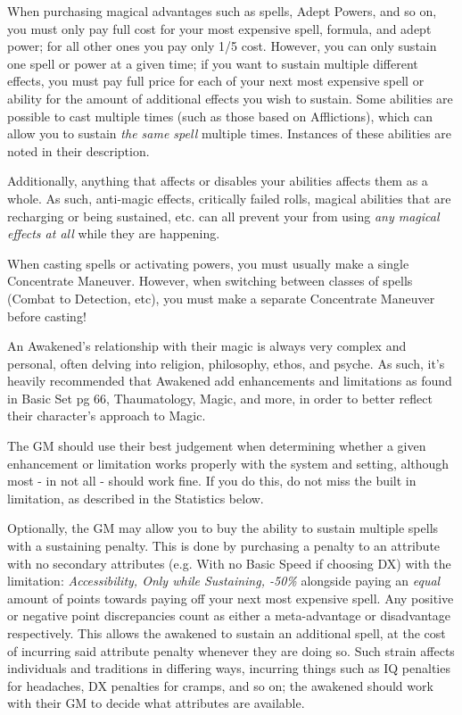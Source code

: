 \begin{multicols*}{3}
	When purchasing magical advantages such as spells, Adept Powers, and so on, you must only pay full cost for your most expensive spell, formula, and adept power; for all other ones you pay only 1/5 cost. However, you can only sustain one spell or power at a given time; if you want to sustain multiple different effects, you must pay full price for each of your next most expensive spell or ability for the amount of additional effects you wish to sustain. Some abilities are possible to cast multiple times (such as those based on Afflictions), which can allow you to sustain \textit{the same spell} multiple times. Instances of these abilities are noted in their description.
	
	Additionally, anything that affects or disables your abilities affects them as a whole. As such, anti-magic effects, critically failed rolls, magical abilities that are recharging or being sustained, etc. can all prevent your from using \textit{any magical effects at all} while they are happening.
	
	When casting spells or activating powers, you must usually make a single Concentrate Maneuver. However, when switching between classes of spells (Combat to Detection, etc), you must make a separate Concentrate Maneuver before casting!
	
	An Awakened's relationship with their magic is always very complex and personal, often delving into religion, philosophy, ethos, and psyche. As such, it's heavily recommended that Awakened add enhancements and limitations as found in Basic Set pg 66, Thaumatology, Magic, and more, in order to better reflect their character's approach to Magic.
	
	The GM should use their best judgement when determining whether a given enhancement or limitation works properly with the system and setting, although most - in not all - should work fine. If you do this, do not miss the built in limitation, as described in the Statistics below.
	
	Optionally, the GM may allow you to buy the ability to sustain multiple spells with a sustaining penalty. This is done by purchasing a penalty to an attribute with no secondary attributes (e.g. With no Basic Speed if choosing DX) with the limitation: \textit{Accessibility, Only while Sustaining, -50\%} alongside paying an \textit{equal} amount of points towards paying off your next most expensive spell. Any positive or negative point discrepancies count as either a meta-advantage or disadvantage respectively. This allows the awakened to sustain an additional spell, at the cost of incurring said attribute penalty whenever they are doing so. Such strain affects individuals and traditions in differing ways, incurring things such as IQ penalties for headaches, DX penalties for cramps, and so on; the awakened should work with their GM to decide what attributes are available. 
	

\end{multicols*}
